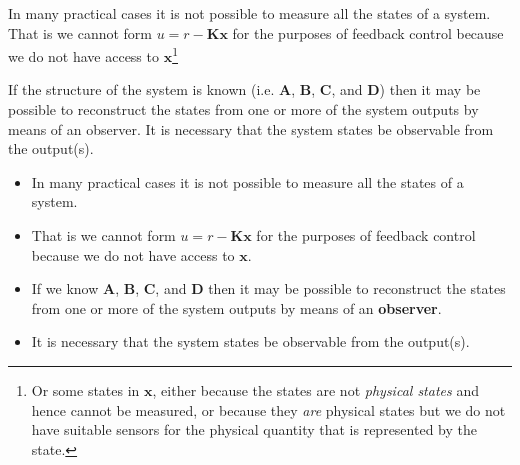 \def\FileDate{10/04/02}
\def\FileVersion{1.0}

In many practical cases it is not possible to measure all the states of a system.
That is  we cannot form  $u=r-\mathbf{Kx}$  for the purposes of feedback control because we do not have access to $\mathbf{x}$\footnote{Or some states in $\mathbf{x}$, either because the states are not \emph{physical states} and hence cannot be measured, or because they \emph{are} physical states but we do not have suitable sensors for the physical quantity that is represented by the state.}

If the structure of the system is known  (i.e. $\mathbf{A}$, $\mathbf{B}$, $\mathbf{C}$, and $\mathbf{D}$) then it may be possible to reconstruct the states from one or more of the system outputs by means of an observer. It is necessary that the system states be observable from the output(s).

\ifslidesonly
\begin{slide}
   \begin{itemize}
   	\item In many practical cases it is not possible to measure all the states of a system.
   	\item That is  we cannot form  $u=r-\mathbf{Kx}$  for the purposes of feedback control because we do not have access to $\mathbf{x}$.
   	\item If we know $\mathbf{A}$, $\mathbf{B}$, $\mathbf{C}$, and $\mathbf{D}$ then it may be possible to reconstruct the states from one or more of the system outputs by means of an \textbf{observer}. 
   	\item It is necessary that the system states be observable from the output(s).
   \end{itemize}
\end{slide}
\fi

